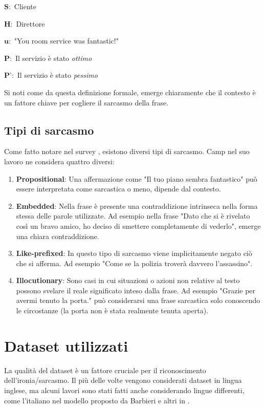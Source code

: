 \documentclass[oneside]{book}
\begin{document}
$\textbf{S}:$ Cliente

$\textbf{H}:$ Direttore

$\textbf{u}:$ "You room service was fantastic!"

$\textbf{P}:$ Il servizio è stato \textit{ottimo}

$\textbf{P'}:$ Il servizio è stato \textit{pessimo}

\noindent
Si noti come da questa definizione formale, emerge chiaramente che il contesto è un fattore chiave per cogliere il sarcasmo della frase.
\subsection{Tipi di sarcasmo}
Come fatto notare nel survey \cite{survey5}, esistono diversi tipi di sarcasmo. Camp nel suo lavoro \cite{tipi-sarcasmo} ne considera quattro diversi:
\begin{enumerate}
	\item \textbf{Propositional}: Una affermazione come "Il tuo piano sembra fantastico" può essere interpretata come sarcastica o meno, dipende dal contesto.
	\item \textbf{Embedded}: Nella frase è presente una contraddizione intrinseca nella forma stessa delle parole utilizzate. Ad esempio nella frase "Dato che si è rivelato così un bravo amico, ho deciso di smettere completamente di vederlo", emerge una chiara contraddizione.
	\item \textbf{Like-prefixed}: In questo tipo di sarcasmo viene implicitamente negato ciò che si afferma. Ad esempio "Come se la polizia troverà davvero l'assassino".
	\item \textbf{Illocutionary}: Sono casi in cui situazioni o azioni non relative al testo possono svelare il reale significato inteso dalla frase. Ad esempio "Grazie per avermi tenuto la porta." può considerarsi una frase sarcastica solo conoscendo le circostanze (la porta non è stata realmente tenuta aperta).
	
\end{enumerate}


\section{Dataset utilizzati}
La qualità del dataset è un fattore cruciale per il riconoscimento dell'ironia/sarcasmo. Il più delle volte vengono considerati dataset in lingua inglese, ma alcuni lavori sono stati fatti anche considerando lingue differenti, come l'italiano nel modello proposto da Barbieri e altri in \cite{sarcasm-ita}.
\end{document}
